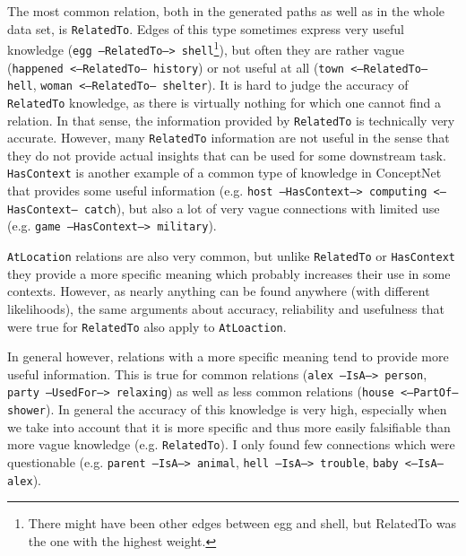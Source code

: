 \documentclass{article}
\begin{document}
The most common relation, both in the generated paths as well as in
the whole data set, is \texttt{RelatedTo}. Edges of this type sometimes
express very useful knowledge (\texttt{egg --RelatedTo-->
  shell}\footnote{There might have been other edges between egg and
  shell, but RelatedTo was the one with the highest weight.}), but
often they are rather vague (\texttt{happened <--RelatedTo-- history})
or not useful at all (\texttt{town <--RelatedTo-- hell}, \texttt{woman
  <--RelatedTo-- shelter}). It is hard to judge the accuracy of
\texttt{RelatedTo} knowledge, as there is virtually nothing for which
one cannot find a relation. In that sense, the information provided by
\texttt{RelatedTo} is technically very accurate.  However, many
\texttt{RelatedTo} information are not useful in the sense that they do not
provide actual insights that can be used for some downstream
task. \texttt{HasContext} is another example of a common type of knowledge in
ConceptNet that provides some useful information
(e.g. \texttt{host --HasContext--> computing <--HasContext-- catch}),
but also a lot of very vague connections with limited use
(e.g. \texttt{game --HasContext--> military}).

\texttt{AtLocation} relations are also very common, but unlike
\texttt{RelatedTo} or \texttt{HasContext} they provide a more specific
meaning which probably increases their use in some contexts.  However,
as nearly anything can be found anywhere (with different likelihoods),
the same arguments about accuracy, reliability and usefulness that
were true for \texttt{RelatedTo} also apply to \texttt{AtLoaction}.

In general however, relations with a more specific meaning tend to
provide more useful information. This is true for common relations
(\texttt{alex --IsA--> person}, \texttt{party --UsedFor--> relaxing})
as well as less common relations (\texttt{house <--PartOf--
  shower}). In general the accuracy of this knowledge is very high,
especially when we take into account that it is more specific and thus
more easily falsifiable than more vague knowledge
(e.g. \texttt{RelatedTo}). I only found few connections which were
questionable (e.g. \texttt{parent --IsA--> animal}, \texttt{hell
  --IsA--> trouble}, \texttt{baby <--IsA-- alex}).
\end{document}
